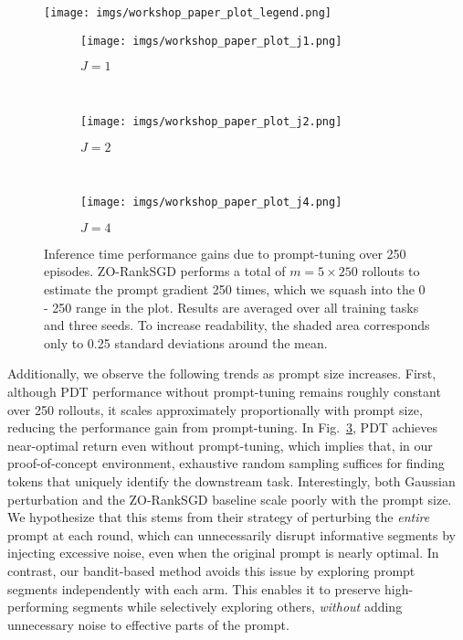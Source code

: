 \documentclass{article}
\begin{document}
\begin{figure*}[t!]
    \centering
    \texttt{[image: imgs/workshop\_paper\_plot\_legend.png]}
    \begin{subfigure}[t]{0.3\textwidth}
        \centering
        \texttt{[image: imgs/workshop\_paper\_plot\_j1.png]}
        \caption{$J=1$}\label{subfig:online_j1}
    \end{subfigure}
    ~
    \begin{subfigure}[t]{0.3\textwidth}
        \centering
        \texttt{[image: imgs/workshop\_paper\_plot\_j2.png]}
        \caption{$J=2$}\label{subfig:online_j2}
    \end{subfigure}
    ~
    \begin{subfigure}[t]{0.3\textwidth}
        \centering
        \texttt{[image: imgs/workshop\_paper\_plot\_j4.png]}
        \caption{$J=4$}\label{subfig:online_j4}
    \end{subfigure}
    \caption{Inference time performance gains due to prompt-tuning over 250 episodes. 
    ZO-RankSGD performs a total of $m=5 \times 250$ rollouts 
    to estimate the prompt gradient 250 times, which we squash into the 0 - 250 range in the plot.
    Results are averaged over all training tasks and three seeds. To increase readability, the shaded area corresponds only to 0.25 standard deviations around the mean.}\label{fig:online-propmt-tuning}
\end{figure*}

Additionally, we observe the following trends as prompt size increases.
First, although PDT performance without prompt-tuning remains roughly constant over 250 rollouts, it scales approximately proportionally with prompt size, reducing the performance gain from prompt-tuning.
In Fig.~\ref{subfig:online_j4}, PDT achieves near-optimal return even without prompt-tuning, which implies that, in our proof-of-concept environment, exhaustive random sampling suffices for finding tokens that uniquely identify the downstream task.
Interestingly, both Gaussian perturbation and the ZO-RankSGD baseline scale poorly with the prompt size.
We hypothesize that this stems from their strategy of perturbing the \textit{entire} prompt at each round, which can unnecessarily disrupt informative segments by injecting excessive noise, even when the original prompt is nearly optimal.
In contrast, our bandit-based method avoids this issue by exploring prompt segments independently with each arm. This enables it to preserve high-performing segments while selectively exploring others, \textit{without} adding unnecessary noise to effective parts of the prompt.
\end{document}
